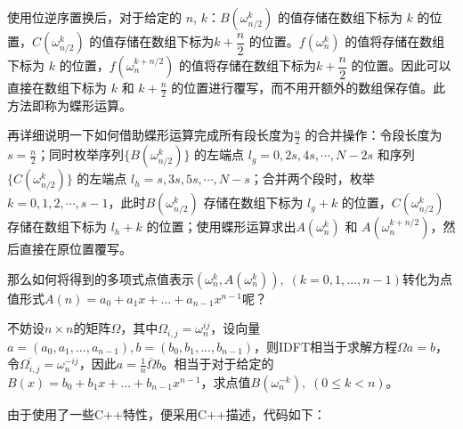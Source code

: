 \documentclass{article}
\begin{document}
使用位逆序置换后，对于给定的 $n$, $k$：$B(\omega_{n/2}^k)$ 的值存储在数组下标为 $k$ 的位置，$C(\omega_{n/2}^k)$ 的值存储在数组下标为$k + \dfrac{n}{2}$ 的位置。$f(\omega_n^k)$ 的值将存储在数组下标为 $k$ 的位置，$f(\omega_n^{k+n/2})$ 的值将存储在数组下标为$k + \dfrac{n}{2}$ 的位置。因此可以直接在数组下标为 $k$ 和 $k + \frac{n}{2}$ 的位置进行覆写，而不用开额外的数组保存值。此方法即称为蝶形运算。

再详细说明一下如何借助蝶形运算完成所有段长度为$\frac{n}{2}$ 的合并操作：令段长度为$s = \frac{n}{2}$；同时枚举序列$\{B(\omega_{n/2}^k)\}$ 的左端点 $l_g = 0, 2s, 4s, \cdots, N-2s$ 和序列$\{C(\omega_{n/2}^k)\}$ 的左端点 $l_h = s, 3s, 5s, \cdots, N-s$；合并两个段时，枚举 $k = 0, 1, 2, \cdots, s-1$，此时$B(\omega_{n/2}^k)$ 存储在数组下标为 $l_g + k$ 的位置，$C(\omega_{n/2}^k)$ 存储在数组下标为 $l_h + k$ 的位置；使用蝶形运算求出$A(\omega_n^k)$ 和 $A(\omega_n^{k+n/2})$，然后直接在原位置覆写。

那么如何将得到的多项式点值表示$(\omega_n^k,A(\omega_n^k)),\;(k=0,1,...,n-1)$转化为点值形式$A(n)=a_0+a_1x+...+a_{n-1}x^{n-1}$呢？

不妨设$n\times n$的矩阵$\Omega$，其中$\Omega_{i,j}=\omega_{n}^{ij}$，设向量$a=(a_0,a_1,...,a_{n-1}),b=(b_0,b_1,...,b_{n-1})$，则IDFT相当于求解方程$\Omega a=b$，令$\overline{\Omega_{i,j}}=\omega_n^{-ij}$，因此$a=\frac{1}{n}\overline{\Omega}b$。相当于对于给定的$B(x)=b_0+b_1x+...+b_{n-1}x^{n-1}$，求点值$B(\omega_n^{-k}),\;(0 \leq k < n)$。

由于使用了一些C++特性，便采用C++描述，代码如下：
\end{document}
